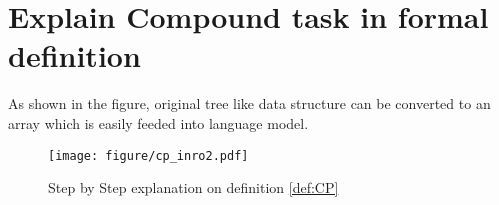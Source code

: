 \section{Explain Compound task in formal definition}
As shown in the figure, original tree like data structure can be converted to an array which is easily feeded into language model.
\begin{figure}
    \centering
    \texttt{[image: figure/cp\_inro2.pdf]}
    \caption{Step by Step explanation on definition \ref{def:CP}}
    \label{fig:cp2}
\end{figure}